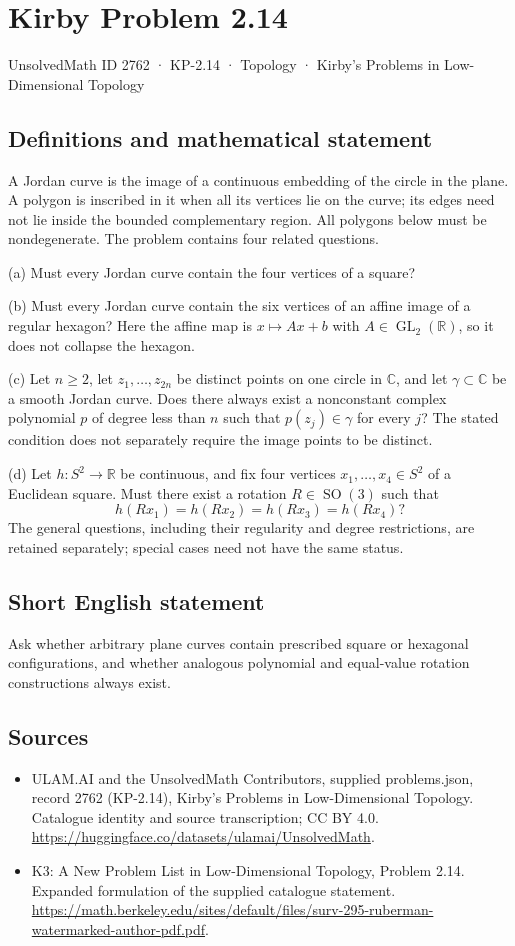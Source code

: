 \documentclass[11pt,a4paper]{article}
\begin{document}
\section*{Kirby Problem 2.14}\label{2762}
{\small UnsolvedMath ID 2762 · KP-2.14 · Topology · Kirby's Problems in Low-Dimensional Topology}
\subsection{Definitions and mathematical statement}
A Jordan curve is the image of a continuous embedding of the circle in the
plane. A polygon is inscribed in it when all its vertices lie on the curve;
its edges need not lie inside the bounded complementary region. All polygons
below must be nondegenerate. The problem contains four related questions.

(a) Must every Jordan curve contain the four vertices of a square?

(b) Must every Jordan curve contain the six vertices of an affine image of a
regular hexagon? Here the affine map is $x\mapsto Ax+b$ with
$A\in\operatorname{GL}_2(\mathbb R)$, so it does not collapse the hexagon.

(c) Let $n\geq2$, let $z_1,\ldots,z_{2n}$ be distinct points on one circle in
$\mathbb C$, and let $\gamma\subset\mathbb C$ be a smooth Jordan curve.
Does there always exist a nonconstant complex polynomial $p$ of degree less
than $n$ such that $p(z_j)\in\gamma$ for every $j$? The stated condition does
not separately require the image points to be distinct.

(d) Let $h:S^2\to\mathbb R$ be continuous, and fix four vertices
$x_1,\ldots,x_4\in S^2$ of a Euclidean square. Must there exist a rotation
$R\in\operatorname{SO}(3)$ such that
\[
 h(Rx_1)=h(Rx_2)=h(Rx_3)=h(Rx_4)?
\]
The general questions, including their regularity and degree restrictions,
are retained separately; special cases need not have the same status.
\subsection{Short English statement}
Ask whether arbitrary plane curves contain prescribed square or hexagonal configurations, and whether analogous polynomial and equal-value rotation constructions always exist.
\subsection{Sources}
\begin{itemize}
\item[S1] ULAM.AI and the UnsolvedMath Contributors, supplied problems.json, record 2762 (KP-2.14), Kirby's Problems in Low-Dimensional Topology. Catalogue identity and source transcription; CC BY 4.0.
\url{https://huggingface.co/datasets/ulamai/UnsolvedMath}.
\item[S2] K3: A New Problem List in Low-Dimensional Topology, Problem 2.14. Expanded formulation of the supplied catalogue statement.
\url{https://math.berkeley.edu/sites/default/files/surv-295-ruberman-watermarked-author-pdf.pdf}.
\end{itemize}
\end{document}
